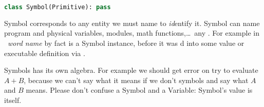 \clearpage{}\label{Symbol}

\begin{lstlisting}[language=Python]
class Symbol(Primitive): pass
\end{lstlisting}

\noindent
Symbol corresponds to any entity we must name to \emph{id}entify it. Symbol can
name program and physical variables, modules, math functions,\ldots\ any
. For example in \F\ \emph{word name} by fact is a Symbol instance,
before it was d into some value or executable definition via
.

Symbols has its own algebra. For example we should get error on try to evaluate
$A+B$, because we can't say what it means if we don't  symbols and
say what $A$ and $B$ means. Please don't confuse a Symbol and a Variable:
Symbol's value is itself.
